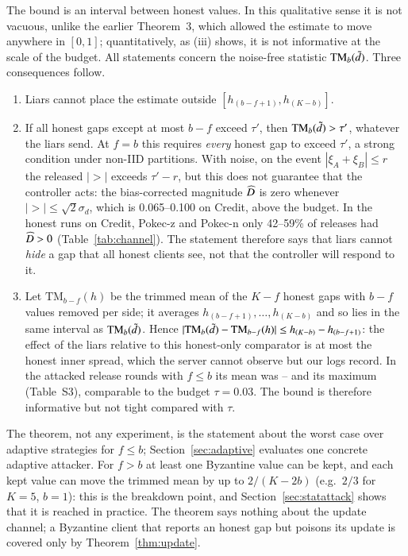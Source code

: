 The bound is an interval between honest values. In this qualitative sense it is not vacuous, unlike the earlier Theorem~3, which allowed the estimate to move anywhere in $[0,1]$; quantitatively, as (iii) shows, it is not informative at the scale of the budget. All statements concern the noise-free statistic $\mathrm{TM}_b(\tilde d)$. Three consequences follow.
\begin{enumerate}
\item[(i)] Liars cannot place the estimate outside $[h_{(b-f+1)},h_{(K-b)}]$.
\item[(ii)] If all honest gaps except at most $b-f$ exceed $\tau'$, then $\mathrm{TM}_b(\tilde d)>\tau'$, whatever the liars send. At $f=b$ this requires \emph{every} honest gap to exceed $\tau'$, a strong condition under non-IID partitions. With noise, on the event $|\xi_A+\xi_B|\le r$ the released $|\gt|$ exceeds $\tau'-r$, but this does not guarantee that the controller acts: the bias-corrected magnitude $\widehat{D}$ is zero whenever $|\gt|\le\sqrt2\sigma_d$, which is 0.065--0.100 on Credit, above the budget. In the honest runs on Credit, Pokec-z and Pokec-n only 42--59\% of releases had $\widehat{D}>0$ (Table~\ref{tab:channel}). The statement therefore says that liars cannot \emph{hide} a gap that all honest clients see, not that the controller will respond to it.
\item[(iii)] Let $\mathrm{TM}_{b-f}(h)$ be the trimmed mean of the $K-f$ honest gaps with $b-f$ values removed per side; it averages $h_{(b-f+1)},\dots,h_{(K-b)}$ and so lies in the same interval as $\mathrm{TM}_b(\tilde d)$. Hence $|\mathrm{TM}_b(\tilde d)-\mathrm{TM}_{b-f}(h)|\le h_{(K-b)}-h_{(b-f+1)}$: the effect of the liars relative to this honest-only comparator is at most the honest inner spread, which the server cannot observe but our logs record. In the attacked release rounds with $f\le b$ its mean was \spreadMin--\spreadMax{} and its maximum \spreadMaxAll{} (Table~S3), comparable to the budget $\tau=0.03$. The bound is therefore informative but not tight compared with $\tau$.
\end{enumerate}
The theorem, not any experiment, is the statement about the worst case over adaptive strategies for $f\le b$; Section~\ref{sec:adaptive} evaluates one concrete adaptive attacker. For $f>b$ at least one Byzantine value can be kept, and each kept value can move the trimmed mean by up to $2/(K-2b)$ (e.g.\ $2/3$ for $K=5$, $b=1$): this is the breakdown point, and Section~\ref{sec:statattack} shows that it is reached in practice. The theorem says nothing about the update channel; a Byzantine client that reports an honest gap but poisons its update is covered only by Theorem~\ref{thm:update}.

